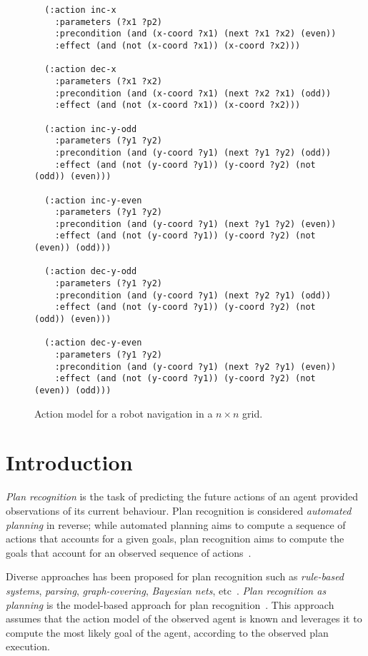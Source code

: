 \documentclass[letterpaper]{article} %
\begin{document}
\begin{figure}
  \begin{tiny}
  \begin{verbatim}       
  (:action inc-x
    :parameters (?x1 ?p2)
    :precondition (and (x-coord ?x1) (next ?x1 ?x2) (even))
    :effect (and (not (x-coord ?x1)) (x-coord ?x2)))

  (:action dec-x
    :parameters (?x1 ?x2)
    :precondition (and (x-coord ?x1) (next ?x2 ?x1) (odd))
    :effect (and (not (x-coord ?x1)) (x-coord ?x2)))

  (:action inc-y-odd
    :parameters (?y1 ?y2)
    :precondition (and (y-coord ?y1) (next ?y1 ?y2) (odd))
    :effect (and (not (y-coord ?y1)) (y-coord ?y2) (not (odd)) (even)))

  (:action inc-y-even
    :parameters (?y1 ?y2)
    :precondition (and (y-coord ?y1) (next ?y1 ?y2) (even))
    :effect (and (not (y-coord ?y1)) (y-coord ?y2) (not (even)) (odd)))

  (:action dec-y-odd
    :parameters (?y1 ?y2)
    :precondition (and (y-coord ?y1) (next ?y2 ?y1) (odd))
    :effect (and (not (y-coord ?y1)) (y-coord ?y2) (not (odd)) (even)))

  (:action dec-y-even
    :parameters (?y1 ?y2)
    :precondition (and (y-coord ?y1) (next ?y2 ?y1) (even))
    :effect (and (not (y-coord ?y1)) (y-coord ?y2) (not (even)) (odd)))
  \end{verbatim}           
  \end{tiny}  
 \caption{\small Action model for a robot navigation in a $n\times n$ grid.}
\label{fig:model-example}
\end{figure}



\section{Introduction}
\label{sec:introduction}
{\em Plan recognition} is the task of predicting the future actions of an agent provided observations of its current behaviour. Plan recognition is considered {\em automated planning} in reverse; while automated planning aims to compute a sequence of actions that accounts for a given goals, plan recognition aims to compute the goals that account for an observed sequence of actions~\cite{geffner:book:2013}.

Diverse approaches has been proposed for plan recognition such as {\em rule-based systems}, {\em parsing}, {\em graph-covering}, {\em Bayesian nets}, etc~\cite{carberry2001techniques}. {\em Plan recognition as planning} is the model-based approach for plan recognition~\cite{ramirez2012plan,ramirez2009plan}. This approach assumes that the action model of the observed agent is known and leverages it to compute the most likely goal of the agent, according to the observed plan execution.
\end{document}
